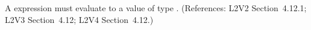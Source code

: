 A \Constraint {} expression must evaluate to a value of type
.  (References: L2V2 Section~4.12.1; L2V3
Section~4.12; L2V4 Section~4.12.)
